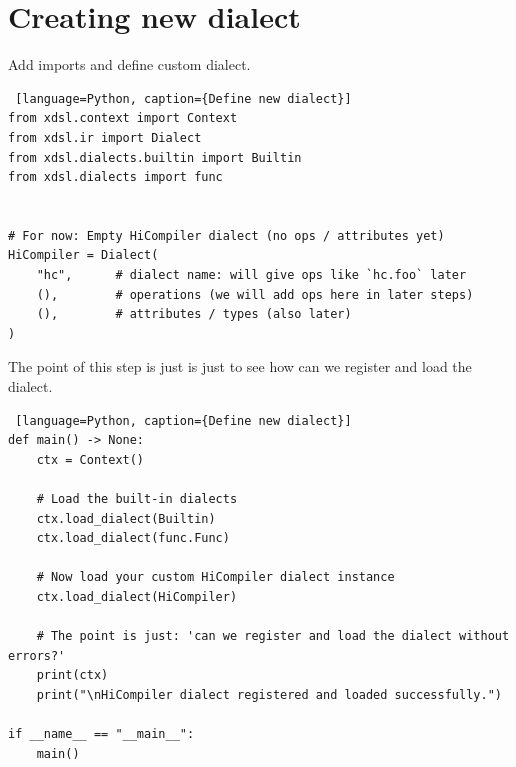 \documentclass[../main.tex]{subfiles}
\begin{document}
\section{Creating new dialect}
Add imports and define custom dialect.
\begin{lstlisting} [language=Python, caption={Define new dialect}]
from xdsl.context import Context
from xdsl.ir import Dialect
from xdsl.dialects.builtin import Builtin
from xdsl.dialects import func


# For now: Empty HiCompiler dialect (no ops / attributes yet)
HiCompiler = Dialect(
    "hc",      # dialect name: will give ops like `hc.foo` later
    (),        # operations (we will add ops here in later steps)
    (),        # attributes / types (also later)
)
\end{lstlisting}
The point of this step is just is just to see how can we register and load the dialect.
\begin{lstlisting} [language=Python, caption={Define new dialect}]
def main() -> None:
    ctx = Context()

    # Load the built-in dialects
    ctx.load_dialect(Builtin)
    ctx.load_dialect(func.Func)

    # Now load your custom HiCompiler dialect instance
    ctx.load_dialect(HiCompiler)

    # The point is just: 'can we register and load the dialect without errors?'
    print(ctx)
    print("\nHiCompiler dialect registered and loaded successfully.")

if __name__ == "__main__":
    main()
\end{lstlisting}
\end{document}
